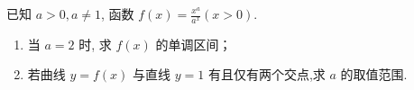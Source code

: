 \documentclass[class=ctexart,crop=false]{standalone}
\begin{document}
已知 $a>0,a \neq 1$, 函数 $f(x)=\frac{x^a}{a^x}(x>0)$.
\begin{enumerate}[label=(\arabic*)]
    \item 当 $a=2$ 时, 求 $f(x)$ 的单调区间；
    \item 若曲线 $y=f(x)$ 与直线 $y=1$ 有且仅有两个交点,求 $a$ 的取值范围.
\end{enumerate}
\end{document}
